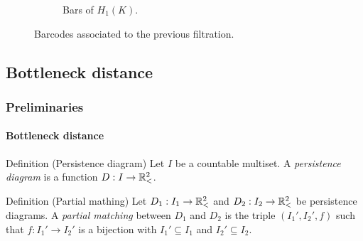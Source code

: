 \documentclass[aspectratio=169]{beamer}
\begin{document}
\begin{frame}
\begin{figure}
\begin{subfigure}[b]{0.4\linewidth}
            \caption{Bars of $H_1(K)$.}
        \end{subfigure}
        \caption{Barcodes associated to the previous filtration.}
    \end{figure}
\end{frame}

\subsection{Bottleneck distance}

\begin{frame}
  \frametitle{Preliminaries}
  \framesubtitle{Bottleneck distance}

  \begin{block}{Definition (Persistence diagram)}
      Let $ I $ be a countable multiset. A {\it persistence diagram} is a function $ D: I \to \mathbb{R}_<^2 $.
  \end{block}
  \pause
  \begin{block}{Definition (Partial mathing)}
      Let $ D_1: I_1 \to \mathbb{R}_<^2 $ and $ D_2: I_2 \to \mathbb{R}_<^2 $ be persistence diagrams. A {\it partial matching} between $ D_1 $ and $ D_2 $ is the triple $ (I_1', I_2', f) $ such that $ f: I_1' \to I_2' $ is a bijection with $ I_1' \subseteq I_1 $ and $ I_2' \subseteq I_2 $.
  \end{block}

\end{frame}
\end{document}
